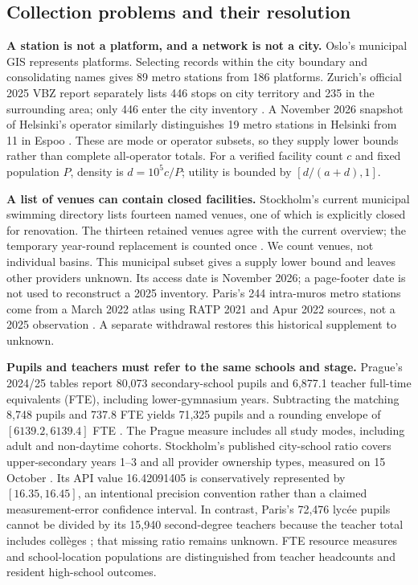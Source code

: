 \documentclass[12pt]{article}
\begin{document}
\subsection{Collection problems and their resolution}
\textbf{A station is not a platform, and a network is not a city.}
Oslo's municipal GIS represents platforms. Selecting records within the city
boundary and consolidating names gives 89 metro stations from 186 platforms.
Zurich's official 2025 VBZ report separately lists 446 stops on city territory
and 235 in the surrounding area; only 446 enter the city inventory
\cite{oslo,vbz}. A November 2026 snapshot of Helsinki's operator similarly
distinguishes 19 metro stations in Helsinki from 11 in Espoo \cite{helsinki}.
These are mode or operator subsets, so they supply
lower bounds rather than complete all-operator totals. For a verified facility
count $c$ and fixed population $P$, density is $d=10^5c/P$; utility is bounded by
$[d/(a+d),1]$.

\textbf{A list of venues can contain closed facilities.}
Stockholm's current municipal swimming directory lists fourteen named venues,
one of which is explicitly closed for renovation. The thirteen retained venues
agree with the current overview; the temporary year-round replacement is
counted once \cite{stockpool}. We count venues, not individual basins. This
municipal subset gives a supply lower bound and leaves other providers unknown.
Its access date is November 2026; a page-footer date is not used to reconstruct
a 2025 inventory. Paris's 244 intra-muros metro stations come from a March 2022
atlas using RATP 2021 and Apur 2022 sources, not a 2025 observation
\cite{apur}. A separate withdrawal restores this historical supplement to unknown.

\textbf{Pupils and teachers must refer to the same schools and stage.}
Prague's 2024/25 tables report 80,073 secondary-school pupils and 6,877.1
teacher full-time equivalents (FTE), including lower-gymnasium years.
Subtracting the matching 8,748 pupils and 737.8 FTE yields 71,325 pupils and
a rounding envelope of $[6139.2,6139.4]$ FTE \cite{prague}. The Prague
measure includes all study modes, including adult and non-daytime cohorts.
Stockholm's
published city-school ratio covers upper-secondary years 1--3 and all provider
ownership types, measured on 15 October \cite{kolada}. Its API value
16.42091405 is conservatively represented by $[16.35,16.45]$, an intentional
precision convention rather than a claimed measurement-error confidence interval.
In contrast, Paris's 72,476 lyc\'ee pupils cannot be divided by its 15,940
second-degree teachers because the teacher total includes coll\`eges
\cite{parisedu}; that missing ratio remains unknown. FTE resource measures
and school-location populations are distinguished from teacher headcounts and
resident high-school outcomes.
\end{document}

